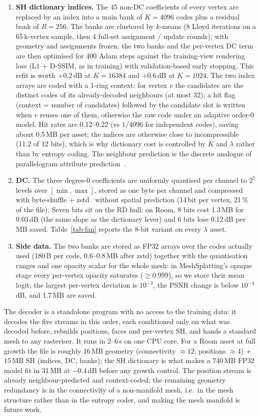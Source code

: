 \documentclass[11pt,a4paper]{article}
\begin{document}
\begin{enumerate}[nosep,leftmargin=*]
  \item \textbf{SH dictionary indices.} The 45 non-DC coefficients of every vertex are replaced by an index into a main bank of $K = 4096$ codes plus a residual bank of $R = 256$. The banks are clustered by $k$-means (8 Lloyd iterations on a 65\,k-vertex sample, then 4 full-set assignment / update rounds); with geometry and assignments frozen, the two banks and the per-vertex DC term are then optimised for 400 Adam steps against the training-view rendering loss (L1 + D-SSIM, as in training) with validation-based early stopping. This refit is worth $+0.2$\,dB at $K = 16384$ and $+0.6$\,dB at $K = 1024$. The two index arrays are coded with a 1-ring context: for vertex $v$ the candidates are the distinct codes of its already-decoded neighbours (at most 32); a hit flag (context = number of candidates) followed by the candidate slot is written when $v$ reuses one of them, otherwise the raw code under an adaptive order-0 model. Hit rates are 0.12--0.22 (vs $1/4096$ for independent codes), saving about 0.5\,MB per asset; the indices are otherwise close to incompressible (11.2 of 12 bits), which is why dictionary cost is controlled by $K$ and $\lambda$ rather than by entropy coding. The neighbour prediction is the discrete analogue of parallelogram attribute prediction~\cite{touma1998,draco}.
  \item \textbf{DC.} The three degree-0 coefficients are uniformly quantised per channel to $2^7$ levels over $[\min, \max]$, stored as one byte per channel and compressed with byte-shuffle + zstd~\cite{zstd} without spatial prediction (14\,bit per vertex, 21\,\% of the file). Seven bits sit on the RD hull: on Room, 8 bits cost 1.3\,MB for 0.03\,dB (the same slope as the dictionary lever) and 6 bits lose 0.12\,dB per MB saved. Table~\ref{tab:fan} reports the 8-bit variant on every $\lambda$ asset.
  \item \textbf{Side data.} The two banks are stored as FP32 arrays over the codes actually used (180\,B per code, 0.6--0.8\,MB after zstd) together with the quantisation ranges and one opacity scalar for the whole mesh: in MeshSplatting's opaque stage every per-vertex opacity saturates ($\geq 0.999$), so we store their mean logit; the largest per-vertex deviation is $10^{-3}$, the PSNR change is below $10^{-4}$\,dB, and 1.7\,MB are saved.
\end{enumerate}
The decoder is a standalone program with no access to the training data: it decodes the five streams in this order, each conditioned only on what was decoded before, rebuilds positions, faces and per-vertex SH, and hands a standard mesh to any rasteriser. It runs in 2--6\,s on one CPU core. For a Room asset at full growth the file is roughly 16\,MB geometry (connectivity $\approx 12$, positions $\approx 4$) + 15\,MB SH (indices, DC, banks); the SH dictionary is what makes a 740\,MB FP32 model fit in 31\,MB at $-0.4$\,dB before any growth control. The position stream is already neighbour-predicted and context-coded; the remaining geometry redundancy is in the connectivity of a non-manifold mesh, i.e.\ in the mesh structure rather than in the entropy coder, and making the mesh manifold is future work.
\end{document}
